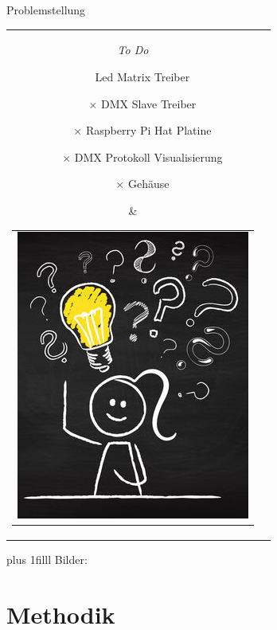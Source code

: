 \documentclass[Nike]{tuberlinbeamer}
\newcommand{\customcite}[1]{
	\vskip0pt plus 1filll
	\color{grau}
	\raggedleft \tiny Bilder: \cite{#1}
}
\begin{document}
\begin{frame}{Problemstellung}
	\begin{tabular}{cl}  
		\parbox{0.45\linewidth}{
			\emph{To Do}
			\begin{itemize}
				\item[\checkmark] Led Matrix Treiber
				\item[$\times$] DMX Slave Treiber
				\item[$\times$] Raspberry Pi Hat Platine
				\item[$\times$] DMX Protokoll Visualisierung
				\item[$\times$] Gehäuse
			\end{itemize}
		}
		&
		\begin{tabular}{c}
			\includegraphics[height=\textheight - 13pt]{pictures/Problemstellung}
		\end{tabular}
	\end{tabular}
	\customcite{problemstellung}
\end{frame}

\section{Methodik}
\end{document}
